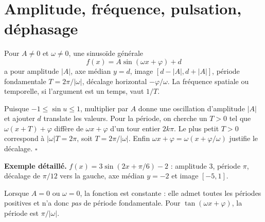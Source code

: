 \documentclass[../cours_spe_trigo.tex]{subfiles}
\begin{document}
\section{Amplitude, fréquence, pulsation, déphasage}
\begin{propriete}
Pour $A\ne0$ et $\omega\ne0$, une sinusoïde générale
\[\boxed{f(x)=A\sin(\omega x+\varphi)+d}\]
a pour amplitude $|A|$, axe médian $y=d$, image $[d-|A|,d+|A|]$, période fondamentale $T=2\pi/|\omega|$, décalage horizontal $-\varphi/\omega$. La fréquence spatiale ou temporelle, si l'argument est un temps, vaut $1/T$.
\end{propriete}
\begin{demonstration}
Puisque $-1\le\sin u\le1$, multiplier par $A$ donne une oscillation d'amplitude $|A|$ et ajouter $d$ translate les valeurs. Pour la période, on cherche un $T>0$ tel que $\omega(x+T)+\varphi$ diffère de $\omega x+\varphi$ d'un tour entier $2k\pi$. Le plus petit $T>0$ correspond à $|\omega|T=2\pi$, soit $T=2\pi/|\omega|$. Enfin $\omega x+\varphi=\omega(x+\varphi/\omega)$ justifie le décalage. $\square$
\end{demonstration}
\textbf{Exemple détaillé.} $f(x)=3\sin(2x+\pi/6)-2$ : amplitude $3$, période $\pi$, décalage de $\pi/12$ vers la gauche, axe médian $y=-2$ et image $[-5,1]$.
\begin{attention}
Lorsque $A=0$ ou $\omega=0$, la fonction est constante : elle admet toutes les périodes positives et n'a donc \emph{pas} de période fondamentale. Pour $\tan(\omega x+\varphi)$, la période est $\pi/|\omega|$.
\end{attention}
\end{document}
